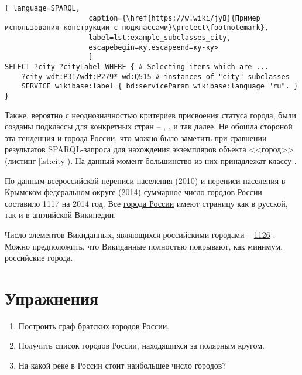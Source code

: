 \begin{lstlisting}[ language=SPARQL, 
                    caption={\href{https://w.wiki/jyB}{Пример использования конструкции с подклассами}\protect\footnotemark},
                    label=lst:example_subclasses_city, 
                    escapebegin=ку,escapeend=ку-ку>
                    ]
SELECT ?city ?cityLabel WHERE { # Selecting items which are ...
	?city wdt:P31/wdt:P279* wd:Q515 # instances of "city" subclasses
	SERVICE wikibase:label { bd:serviceParam wikibase:language "ru". }
}
\end{lstlisting}

Также, вероятно с неоднозначностью критериев присвоения статуса города, были созданы подклассы для конкретных стран -- , ,  и так далее. Не обошла стороной эта тенденция и города России, что можно было заметить при сравнении результатов SPARQL-запроса для нахождения экземпляров объекта <<город>> (листинг \ref{lst:city}). На данный момент большинство из них принадлежат классу .

По данным \href{http://www.gks.ru/free\_doc/new\_site/perepis2010/croc/Documents/Vol1/pub-01-03.pdf}{всероссийской переписи населения (2010)}\cite{city_perepis_2010} и \href{https://rosstat.gov.ru/free\_doc/new\_site/population/demo/perepis\_krim/KRUM\_2015.pdf}{переписи населения в Крымском федеральном округе (2014)}\cite{city_perepis_2014} суммарное число городов России составило \num{1117} на 2014 год. Все \href{https://bit.ly/32yqpw5}{города России} имеют страницу как в русской, так и в английской Википедии.

Число элементов Викиданных, являющихся российскими городами -- \href{https://w.wiki/jyP}{1126} . Можно предположить, что Викиданные полностью покрывают, как минимум, российские города. 

\section{Упражнения}
\begin{enumerate}
\item Построить граф братских городов России.
\item Получить список городов России, находящихся за полярным кругом.
\item На какой реке в России стоит наибольшее число городов?
\end{enumerate}